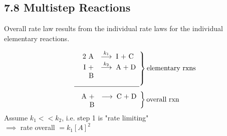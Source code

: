 \subsection{7.8 Multistep Reactions}
    Overall rate law results from the individual rate laws for the individual elementary reactions.
    
    $$
    \left.
        \begin{array}{ll}
            \parbox[t]{0.8cm}{\raggedleft\textrm{2 A}} &\overset{k_1}{\longrightarrow} \; \parbox[t]{1cm}{\textrm{I + C}} \\
            \parbox[t]{0.8cm}{\raggedleft\textrm{I + B}} &\overset{k_2}{\longrightarrow} \; \parbox[t]{1cm}{\textrm{A + D}} \\
            \\
            \hline
        \end{array}
    \right\} \parbox[t]{2cm}{\text{elementary rxns}}
    $$
    $$
    \left.
        \begin{array}{ll}
            \parbox[t]{0.8cm}{\raggedleft\textrm{A + B}} &\overset{}{\longrightarrow} \; \parbox[t]{1cm}{\textrm{C + D}}
        \end{array}
    \right\} \parbox[t]{2cm}{overall rxn}
    \vspace*{0.5em}
    $$
    Assume $k_1 << k_2$, i.e. step 1 is "rate limiting"\\
    $\implies$ rate overall $= k_1[A]^2$